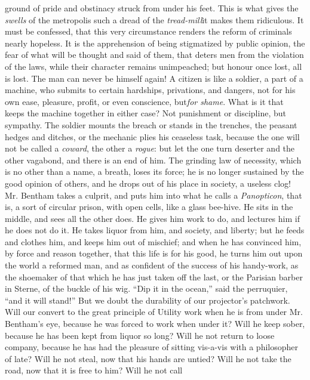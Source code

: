 ground of pride and obstinacy struck from under his feet. This is
what gives the \emph{swells} of the metropolis such a dread of the
\emph{tread-mill}\textemdash it makes them ridiculous. It must be
confessed, that this very circumstance renders the reform of
criminals nearly hopeless. It is the apprehension of being
stigmatized by public opinion, the fear of what will be thought
and said of them, that deters men from the violation of the laws,
while their character remains unimpeached; but honour once lost,
all is lost. The man can never be himself again! A citizen is like
a soldier, a part of a machine, who submits to certain hardships,
privations, and dangers, not for his own ease, pleasure, profit,
or even conscience, but\textemdash\emph{for shame}. What is it
that keeps the machine together in either case? Not punishment or
discipline, but sympathy. The soldier mounts the breach or stands
in the trenches, the peasant hedges and ditches, or the mechanic
plies his ceaseless task, because the one will not be called a
\emph{coward}, the other a \emph{rogue}: but let the one turn
deserter and the other vagabond, and there is an end of him. The
grinding law of necessity, which is no other than a name, a
breath, loses its force; he is no longer sustained by the good
opinion of others, and he drops out of his place in society, a
useless clog! Mr. Bentham takes a culprit, and puts him into what
he calls a \emph{Panopticon}, that is, a sort of circular prison,
with open cells, like a glass bee-hive. He sits in the middle, and
sees all the other does. He gives him work to do, and lectures him
if he does not do it. He takes liquor from him, and society, and
liberty; but he feeds and clothes him, and keeps him out of
mischief; and when he has convinced him, by force and reason
together, that this life is for his good, he turns him out upon
the world a reformed man, and as confident of the success of his
handy-work, as the shoemaker of that which he has just taken off
the last, or the Parisian barber in Sterne, of the buckle of his
wig. ``Dip it in the ocean,'' said the perruquier, ``and it will
stand!'' But we doubt the durability of our projector's
patchwork. Will our convert to the great principle of Utility work
when he is from under Mr. Bentham's eye, because he was forced to
work when under it? Will he keep sober, because he has been kept
from liquor so long? Will he not return to loose company, because
he has had the pleasure of sitting vis-a-vis with a philosopher of
late? Will he not steal, now that his hands are untied? Will he
not take the road, now that it is free to him? Will he not call
